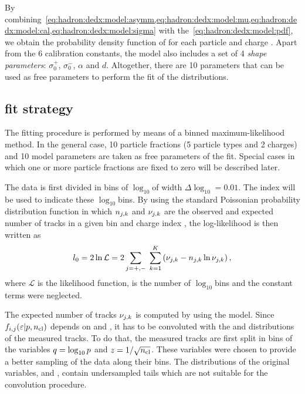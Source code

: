 By combining~\cref{eq:hadron:dedx:model:asymm,eq:hadron:dedx:model:mu,eq:hadron:dedx:model:cal,eq:hadron:dedx:model:sigma}
with the~\cref{eq:hadron:dedx:model:pdf}, we obtain the probability density
function of \eps for each particle \ipart and charge \ich.
Apart from the 6 calibration constants,
the model also includes a set of 4 \textit{shape parameters}: $\sigma_0^+$, $\sigma_0^-$, $\alpha$ and $d$.
Altogether, there are 10 parameters that can be used as free parameters
to perform the fit of the \eps distributions.


\subsection[\dedx fit strategy]{\boldmath \dedx fit strategy}
\label{sec:hadron:dedx:fit}

The fitting procedure is performed by means of a binned maximum-likelihood method.
In the general case, 10 particle fractions (5 particle types and 2 charges) and
10 model parameters are taken as free parameters of the fit. Special cases
in which one or more particle fractions are fixed to zero will be described later.

The \eps data is first divided in bins of $\log_{10}$\eps of width $\Delta\log_{10}$\eps$=0.01$.
The index \ieps will be used to indicate these $\log_{10}$\eps bins.
By using the standard Poissonian probability distribution function in which
$n_{j,k}$ and $\nu_{j,k}$ are the observed and expected
number of tracks in a given bin \ieps and charge index \ich,
the log-likelihood is then written as
\begin{equation}
  l_0 = 2\ln \mathcal{L} = 2\sum_{j=+,-}\;\sum_{k=1}^{K} \left(\nu_{j,k} - n_{j,k}\ln\nu_{j,k}\right), 
  \label{eq:hadron:dedx:fit:l0}
\end{equation}
where $\mathcal{L}$ is the likelihood function, \neps is the number of $\log_{10}$\eps bins and the constant terms were neglected.

The expected number of tracks $\nu_{j,k}$ is computed by using
the \eps model. Since $f_{i,j}(\mbox{$\varepsilon$}|p,\mbox{$n_{\text{cl}}$})$ depends on \pp and \ncl,
it has to be convoluted with the \pp and \ncl distributions
of the measured tracks.
To do that, the measured tracks are first split in
bins of the variables $q = \log_{10} p$ and $z = 1/\sqrt{\mbox{$n_{\text{cl}}$}}$.
These variables were chosen to provide a better sampling
of the data along their bins. The distributions of the
original variables, \pp and \ncl, contain undersampled
tails which are not suitable for the convolution procedure.

